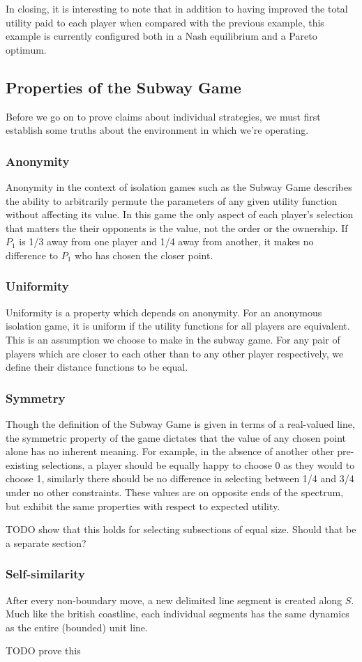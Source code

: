 \documentclass{acm_proc_article-sp}
\begin{document}
In closing, it is interesting to note that in addition to having improved the total utility paid to each player when compared with the previous example, this example is currently configured both in a Nash equilibrium and a Pareto optimum.

\subsection{Properties of the Subway Game}
Before we go on to prove claims about individual strategies, we must first establish some truths about the environment in which we're operating.
\subsubsection{Anonymity}
Anonymity in the context of isolation games such as the Subway Game describes the ability to arbitrarily permute the parameters of any given utility function without affecting its value.\cite{zhao2008isolation} In this game the only aspect of each player's selection that matters the their opponents is the value, not the order or the ownership. If $P_1$ is 1/3 away from one player and 1/4 away from another, it makes no difference to $P_1$ who has chosen the closer point.
\subsubsection{Uniformity}
Uniformity is a property which depends on anonymity. For an anonymous isolation game, it is uniform if the utility functions for all players are equivalent\cite{zhao2008isolation}. This is an assumption we choose to make in the subway game. For any pair of players which are closer to each other than to any other player respectively, we define their distance functions to be equal.
\subsubsection{Symmetry}
Though the definition of the Subway Game is given in terms of a real-valued line, the symmetric property of the game dictates that the value of any chosen point alone has no inherent meaning. For example, in the absence of another other pre-existing selections, a player should be equally happy to choose 0 as they would to choose 1, similarly there should be no difference in selecting between 1/4 and 3/4 under no other constraints. These values are on opposite ends of the spectrum, but exhibit the same properties with respect to expected utility.

TODO show that this holds for selecting subsections of equal size. Should that be a separate section?
\subsubsection{Self-similarity}
After every non-boundary move, a new delimited line segment is created along $S$. Much like the british coastline\cite{mandelbrot1967long}, each individual segments has the same dynamics as the entire (bounded) unit line.

TODO prove this






\end{document}
